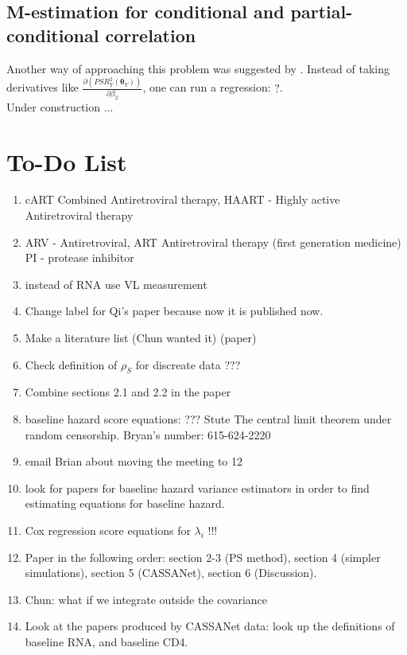 \documentclass[]{article}
\begin{document}
\subsection{M-estimation for conditional and partial-conditional correlation}
Another way of approaching this problem was suggested by \cite{liu2016covariate}. Instead of taking derivatives like $\frac{\partial (PSR_Y^2(\pmb{\theta}_Y))}{\partial \beta_2}$, one can run a regression: $?$.\\
Under construction ...


\section{To-Do List}
\begin{enumerate}
  \item cART Combined Antiretroviral therapy, HAART - Highly active Antiretroviral therapy
  \item ARV - Antiretroviral, ART Antiretroviral therapy (first generation medicine) PI - protease inhibitor
  \item instead of RNA use VL measurement
  \item Change label for Qi's paper because now it is published now.
  \item Make a literature list (Chun wanted it) (paper)
  \item Check definition of $\rho_S$ for discreate data ???
  \item Combine sections 2.1 and 2.2 in the paper
  \item baseline hazard score equations: ???
  Stute The central limit theorem under random censorship. Bryan's number: 615-624-2220
  \item email Brian about moving the meeting to 12
  \item look for papers for baseline hazard variance estimators in order to find estimating equations for baseline hazard.
  \item Cox regression score equations for $\lambda_i$ !!!
  \item Paper in the following order: section 2-3 (PS method), section 4 (simpler simulations), section 5 (CASSANet), section 6 (Discussion).
  \item Chun: what if we integrate outside the covariance
  \item Look at the papers produced by CASSANet data: look up the definitions of baseline RNA, and baseline CD4.

\end{enumerate}
\end{document}

